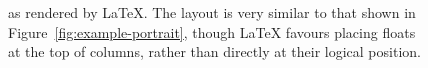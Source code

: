 \begin{figure}
\begin{center}
\vspace{0.2in}
\hspace{0.01\textwidth}
\end{center}
\caption[A document laid out by \LaTeX]{\cite{Pinkney2011} as rendered by \LaTeX. The layout is very similar to that shown in Figure~\ref{fig:example-portrait}, though \LaTeX{} favours placing floats at the top of columns, rather than directly at their logical position.}
\label{fig:example-latex}
\end{figure}

